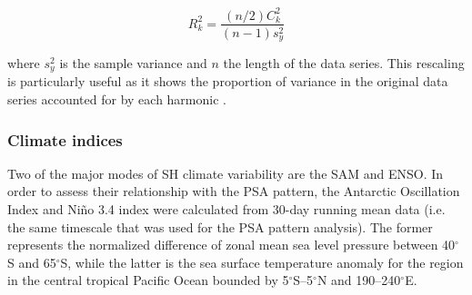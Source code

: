 \begin{equation}\label{eq:variance_explained}
R_k^2 = \frac{(n/2)C_k^2}{(n-1)s_y^2}
\end{equation}

\noindent where $s_y^2$ is the sample variance and $n$ the length of the data series. This rescaling is particularly useful as it shows the proportion of variance in the original data series accounted for by each harmonic \citep{Wilks2011}.

\subsubsection{Climate indices}
Two of the major modes of SH climate variability are the SAM and ENSO. In order to assess their relationship with the PSA pattern, the Antarctic Oscillation Index \citep{Gong1999} and Ni\~{n}o 3.4 index \citep{Trenberth2001} were calculated from 30-day running mean data (i.e. the same timescale that was used for the PSA pattern analysis). The former represents the normalized difference of zonal mean sea level pressure between 40$^{\circ}$S and 65$^{\circ}$S, while the latter is the sea surface temperature anomaly for the region in the central tropical Pacific Ocean bounded by 5$^{\circ}$S--5$^{\circ}$N and 190--240$^{\circ}$E. 

